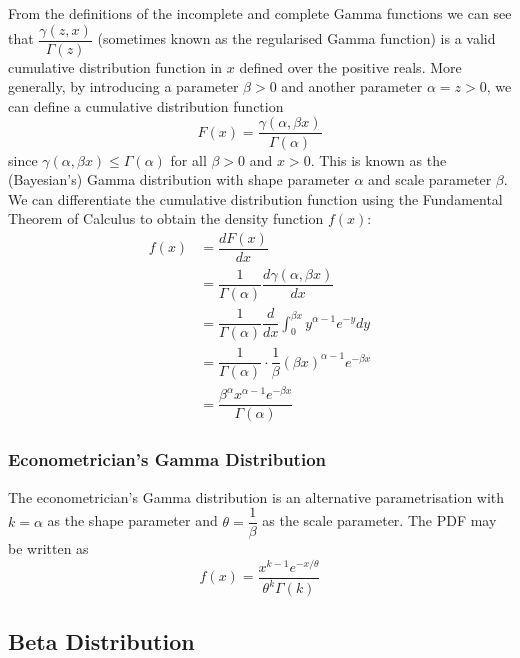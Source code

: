 \documentclass[11pt]{report} %
\begin{document}
From the definitions of the incomplete and complete Gamma functions we can see that $\dfrac{\gamma\left(z, x\right)}{\Gamma\left(z\right)}$ (sometimes known as the regularised Gamma function) is a valid cumulative distribution function in $x$ defined over the positive reals. More generally, by introducing a parameter $\beta >0$ and another parameter $\alpha = z > 0$, we can define a cumulative distribution function
\begin{equation}
F\left(x\right) = \dfrac{\gamma\left(\alpha, \beta x\right)}{\Gamma\left(\alpha\right)}
\end{equation}
since $\gamma\left(\alpha, \beta x\right) \leq \Gamma\left(\alpha\right)$ for all $\beta > 0$ and $x > 0$. This is known as the (Bayesian's) Gamma distribution with shape parameter $\alpha$ and scale parameter $\beta$. We can differentiate the cumulative distribution function using the Fundamental Theorem of Calculus to obtain the density function $f\left(x\right)$:
\begin{align}
f\left(x\right) &= \dfrac{dF\left(x\right)}{dx} \\
&= \dfrac{1}{\Gamma\left(\alpha\right)}\dfrac{d\gamma\left(\alpha, \beta x\right)}{dx} \\
&= \dfrac{1}{\Gamma\left(\alpha\right)}\dfrac{d}{dx}\int_{0}^{\beta x}y^{\alpha - 1}e^{-y}dy \\
&= \dfrac{1}{\Gamma\left(\alpha\right)}\cdot\dfrac{1}{\beta}\left(\beta x\right)^{\alpha - 1}e^{-\beta x} \\
&= \dfrac{\beta^{\alpha}x^{\alpha - 1}e^{-\beta x}}{\Gamma\left(\alpha\right)}
\end{align}

\subsubsection{Econometrician's Gamma Distribution}

The econometrician's Gamma distribution is an alternative parametrisation with $k = \alpha$ as the shape parameter and $\theta = \dfrac{1}{\beta}$ as the scale parameter. The PDF may be written as
\begin{equation}
f\left(x\right) = \dfrac{x^{k - 1}e^{-x/\theta}}{\theta^{k}\Gamma\left(k\right)}
\end{equation}

\subsection{Beta Distribution}
\end{document}
